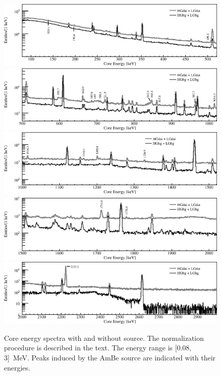\documentclass{elsart}
\begin{document}
\begin{figure}[tbhp]
  \centering
  \includegraphics[width=\textwidth,clip]{spectra_0_520keV.eps}
  \includegraphics[width=\textwidth,clip]{spectra_500_1020keV.eps}
  \includegraphics[width=\textwidth,clip]{spectra_1000_1520keV.eps}
  \includegraphics[width=\textwidth,clip]{spectra_1500_2020keV.eps}
  \includegraphics[width=\textwidth,clip]{spectra_2_3MeV.eps}
  \caption{Core energy spectra with and without source. The
    normalization procedure is described in the text. The energy range
    is [0.08, 3]~MeV. Peaks induced by the AmBe source are indicated
    with their energies.}
  \label{fig:spec}
\end{figure}
\end{document}
